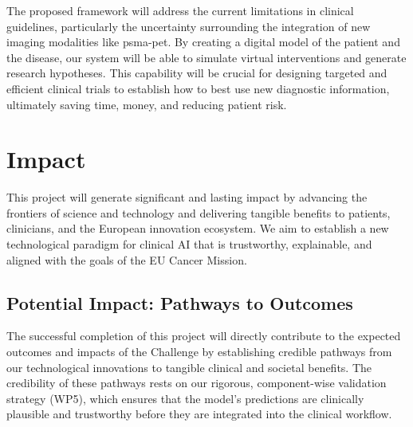 \documentclass[11pt, a4paper]{article}
\begin{document}
The proposed framework will address the current limitations in clinical guidelines, particularly the uncertainty surrounding the integration of new imaging modalities like \gls{psma}-\gls{pet}. By creating a digital model of the patient and the disease, our system will be able to simulate virtual interventions and generate research hypotheses. This capability will be crucial for designing targeted and efficient clinical trials to establish how to best use new diagnostic information, ultimately saving time, money, and reducing patient risk.

\section{Impact}
This project will generate significant and lasting impact by advancing the frontiers of science and technology and delivering tangible benefits to patients, clinicians, and the European innovation ecosystem. We aim to establish a new technological paradigm for clinical AI that is trustworthy, explainable, and aligned with the goals of the EU Cancer Mission.

\subsection{Potential Impact: Pathways to Outcomes}
The successful completion of this project will directly contribute to the expected outcomes and impacts of the Challenge by establishing credible pathways from our technological innovations to tangible clinical and societal benefits. The credibility of these pathways rests on our rigorous, component-wise validation strategy (WP5), which ensures that the model's predictions are clinically plausible and trustworthy before they are integrated into the clinical workflow.
\end{document}
